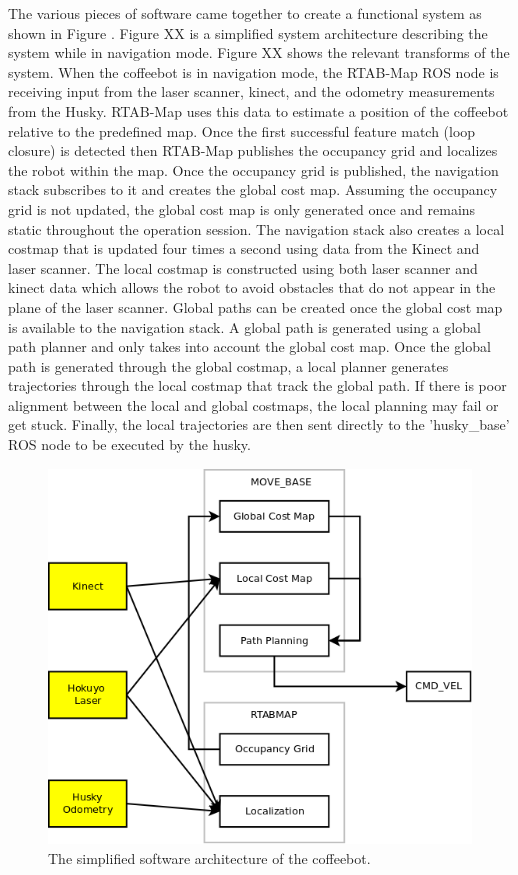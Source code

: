 \documentclass[letterpaper, 10 pt, conference]{ieeeconf}  %
\begin{document}
The various pieces of software came together to create a functional system as shown in Figure . Figure XX is a simplified system architecture describing the system while in navigation mode. Figure XX shows the relevant transforms of the system. When the coffeebot is in navigation mode, the RTAB-Map ROS node is receiving input from the laser scanner, kinect, and the odometry measurements from the Husky. RTAB-Map uses this data to estimate a position of the coffeebot relative to the predefined map. Once the first successful feature match (loop closure) is detected then RTAB-Map publishes the occupancy grid and localizes the robot within the map. Once the occupancy grid is published, the navigation stack subscribes to it and creates the global cost map. Assuming the occupancy grid is not updated, the global cost map is only generated once and remains static throughout the operation session. The navigation stack also creates a local costmap that is updated four times a second using data from the Kinect and laser scanner. The local costmap is constructed using both laser scanner and kinect data which allows the robot to avoid obstacles that do not appear in the plane of the laser scanner. 
Global paths can be created once the global cost map is available to the navigation stack. A global path is generated using a global path planner and only takes into account the global cost map. Once the global path is generated through the global costmap, a local planner generates trajectories through the local costmap that track the global path. If there is poor alignment between the local and global costmaps, the local planning may fail or get stuck. Finally, the local trajectories are then sent directly to the 'husky\_base' ROS node to be executed by the husky. 

	\begin{figure}[!ht]
		\centering
		\includegraphics[width=1.0\columnwidth]{Figures/ROS_node_diagram}
		\caption{The simplified software architecture of the coffeebot.}
		\label{software_architecture}
	\end{figure}
	
\end{document}
